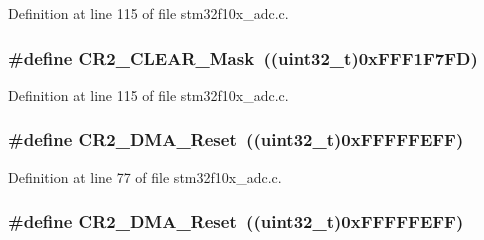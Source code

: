 Definition at line 115 of file stm32f10x\+\_\+adc.\+c.

\subsubsection[{\texorpdfstring{C\+R2\+\_\+\+C\+L\+E\+A\+R\+\_\+\+Mask}{CR2_CLEAR_Mask}}]{\setlength{\rightskip}{0pt plus 5cm}\#define C\+R2\+\_\+\+C\+L\+E\+A\+R\+\_\+\+Mask~(({\bf uint32\+\_\+t})0x\+F\+F\+F1\+F7\+F\+D)}\hypertarget{group___a_d_c___private___defines_ga49192361afb92aee0e3f1124ef1131a0}{}\label{group___a_d_c___private___defines_ga49192361afb92aee0e3f1124ef1131a0}


Definition at line 115 of file stm32f10x\+\_\+adc.\+c.

\subsubsection[{\texorpdfstring{C\+R2\+\_\+\+D\+M\+A\+\_\+\+Reset}{CR2_DMA_Reset}}]{\setlength{\rightskip}{0pt plus 5cm}\#define C\+R2\+\_\+\+D\+M\+A\+\_\+\+Reset~(({\bf uint32\+\_\+t})0x\+F\+F\+F\+F\+F\+E\+F\+F)}\hypertarget{group___a_d_c___private___defines_ga8e674886185af86bc17d9266ddbdca7c}{}\label{group___a_d_c___private___defines_ga8e674886185af86bc17d9266ddbdca7c}


Definition at line 77 of file stm32f10x\+\_\+adc.\+c.

\subsubsection[{\texorpdfstring{C\+R2\+\_\+\+D\+M\+A\+\_\+\+Reset}{CR2_DMA_Reset}}]{\setlength{\rightskip}{0pt plus 5cm}\#define C\+R2\+\_\+\+D\+M\+A\+\_\+\+Reset~(({\bf uint32\+\_\+t})0x\+F\+F\+F\+F\+F\+E\+F\+F)}\hypertarget{group___a_d_c___private___defines_ga8e674886185af86bc17d9266ddbdca7c}{}\label{group___a_d_c___private___defines_ga8e674886185af86bc17d9266ddbdca7c}


